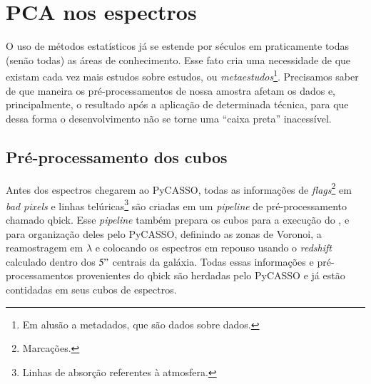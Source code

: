 



\chapter{PCA nos espectros}
\label{sec:UsoPCA}

O uso de métodos estatísticos já se estende por séculos em praticamente todas (senão todas) as áreas de conhecimento.
Esse fato cria uma necessidade de que existam cada vez mais estudos sobre estudos, ou {\em metaestudos}\footnote{Em
alusão a metadados, que são dados sobre dados.}. Precisamos saber de que maneira os pré-processamentos de nossa amostra
afetam os dados e, principalmente, o resultado após a aplicação de determinada técnica, para que dessa forma o
desenvolvimento não se torne uma ``caixa preta'' inacessível.

\section{Pré-processamento dos cubos}
\label{sec:UsoPCA:PCAlidades}

Antes dos espectros chegarem ao PyCASSO, todas as informações de {\em flags}\footnote{Marcações.} em {\em bad pixels} e
linhas telúricas\footnote{Linhas de absorção referentes à atmosfera.} são criadas em um {\em pipeline} de
pré-processamento chamado {\sc qbick}. Esse {\em pipeline} também prepara os cubos para a execução do \starlight, e para
organização deles pelo PyCASSO, definindo as zonas de Voronoi, a reamostragem em $\lambda$ e colocando os espectros em
repouso usando o {\em redshift} calculado dentro dos $5"$ centrais da galáxia. Todas essas informações e
pré-processamentos provenientes do {\sc qbick} são herdadas pelo PyCASSO e já estão contidadas em seus cubos de
espectros.

